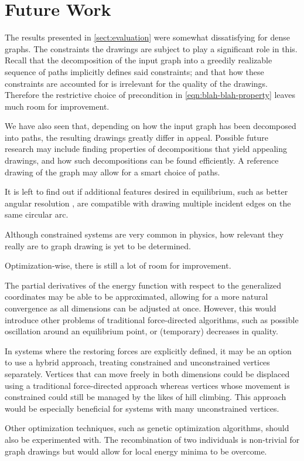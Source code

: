 \chapter{Future Work}
\label{chap:future-work}

The results presented in \cref{sect:evaluation} were somewhat dissatisfying for dense graphs. The constraints the drawings are subject to play a significant role in this. Recall that the decomposition of the input graph into a greedily realizable sequence of paths implicitly defines said constraints; and that how these constraints are accounted for is irrelevant for the quality of the drawings. Therefore the restrictive choice of precondition in \cref{eqn:blah-blah-property} leaves much room for improvement.

We have also seen that, depending on how the input graph has been decomposed into paths, the resulting drawings greatly differ in appeal. Possible future research may include finding properties of decompositions that yield appealing drawings, and how such decompositions can be found efficiently. A reference drawing of the graph may allow for a smart choice of paths.

It is left to find out if additional features desired in equilibrium, such as better angular resolution \cite{Chernobelskiy}, are compatible with drawing multiple incident edges on the same circular arc.

Although constrained systems are very common in physics, how relevant they really are to graph drawing is yet to be determined.



\hfill

\noindent
Optimization-wise, there is still a lot of room for improvement.

The partial derivatives of the energy function with respect to the generalized coordinates may be able to be approximated, allowing for a more natural convergence as all dimensions can be adjusted at once. However, this would introduce other problems of traditional force-directed algorithms, such as possible oscillation around an equilibrium point, or (temporary) decreases in quality.

In systems where the restoring forces are explicitly defined, it may be an option to use a hybrid approach, treating constrained and unconstrained vertices separately. Vertices that can move freely in both dimensions could be displaced using a traditional force-directed approach whereas vertices whose movement is constrained could still be managed by the likes of hill climbing. This approach would be especially beneficial for systems with many unconstrained vertices.

Other optimization techniques, such as genetic optimization algorithms, should also be experimented with. The recombination of two individuals is non-trivial for graph drawings \cite{Branke} but would allow for local energy minima to be overcome.
